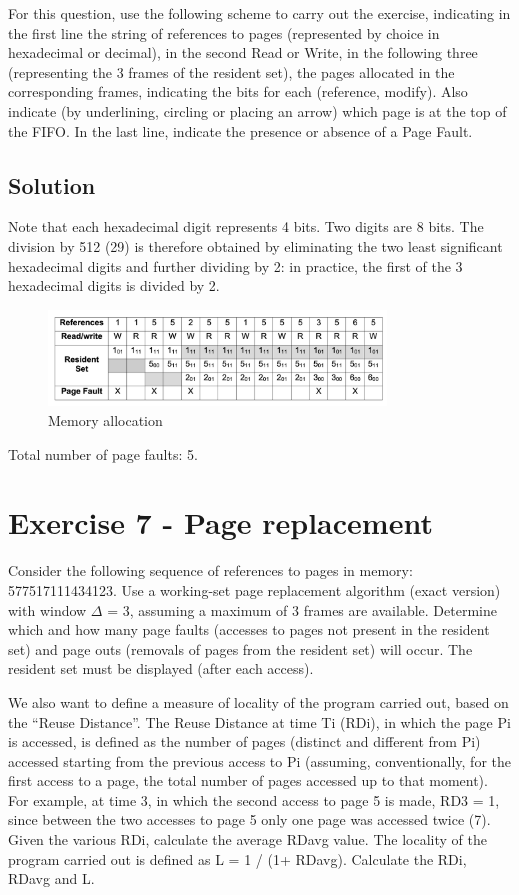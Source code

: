 For this question, use the following scheme to carry out the exercise, indicating in the first line the string of references to pages (represented by choice in hexadecimal or decimal), in the second Read or Write, in the following three (representing the 3 frames of the resident set), the pages allocated in the corresponding frames, indicating the bits for each (reference, modify). Also indicate (by underlining, circling or placing an arrow) which page is at the top of the FIFO.
In the last line, indicate the presence or absence of a Page Fault.

\subsection{Solution}

Note that each hexadecimal digit represents 4 bits. Two digits are 8 bits. The division by 512 (29) is therefore obtained by eliminating the two least significant hexadecimal digits and further dividing by 2: in practice, the first of the 3 hexadecimal digits is divided by 2.

\begin{figure}[hbt]
  \includegraphics[width=0.8\textwidth]{images/ex06.png}
  \caption{Memory allocation}
\end{figure}

Total number of page faults: 5.

\section{Exercise 7 - Page replacement}


Consider the following sequence of references to pages in memory: 577517111434123.
Use a working-set page replacement algorithm (exact version) with window $\Delta$ = 3, assuming a maximum of 3 frames are available. Determine which and how many page faults (accesses to pages not present in the resident set) and page outs (removals of pages from the resident set) will occur. The resident set must be displayed (after each access).

We also want to define a measure of locality of the program carried out, based on the “Reuse Distance”. The Reuse Distance at time Ti (RDi), in which the page Pi is accessed, is defined as the number of pages (distinct and different from Pi) accessed starting from the previous access to Pi (assuming, conventionally, for the first access to a page, the total number of pages accessed up to that moment). For example, at time 3, in which the second access to page 5 is made, RD3 = 1, since between the two accesses to page 5 only one page was accessed twice (7). Given the various RDi, calculate the average RDavg value. The locality of the program carried out is defined as L = 1 / (1+ RDavg). Calculate the RDi, RDavg and L. 

